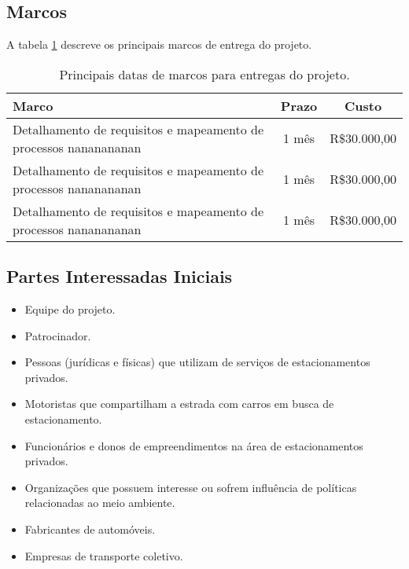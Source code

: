\subsection{Marcos}


A tabela \ref{tab:marcos} descreve os principais marcos de entrega do projeto.

\begin{table}[h]
	\begin{tabularx}{.9\textwidth}{| X | c | c |}
		\hline
		\textbf{Marco}                                                   & \textbf{Prazo} & \textbf{Custo} \\
		\hline
		Detalhamento de requisitos e mapeamento de processos nananananan & 1 mês         & R\$30.000,00   \\
		\hline
		Detalhamento de requisitos e mapeamento de processos nananananan & 1 mês         & R\$30.000,00   \\
		\hline
		Detalhamento de requisitos e mapeamento de processos nananananan & 1 mês         & R\$30.000,00   \\
		\hline
	\end{tabularx}
	\centering
	\caption{Principais datas de marcos para entregas do projeto.}
	\label{tab:marcos}
\end{table}

\subsection{Partes Interessadas Iniciais}

\begin{itemize}
	\item Equipe do projeto.
	\item Patrocinador.
	\item Pessoas (jurídicas e físicas) que utilizam de serviços de estacionamentos privados.
	\item Motoristas que compartilham a estrada com carros em busca de estacionamento.
	\item Funcionários e donos de empreendimentos na área de estacionamentos privados.
	\item Organizações que possuem interesse ou sofrem influência de políticas relacionadas ao meio ambiente.
	\item Fabricantes de automóveis.
	\item Empresas de transporte coletivo.
\end{itemize}

